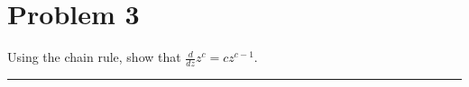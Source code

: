 \documentclass{article}
\newcommand{\der}[2]{\frac{d#1}{d#2}}
\begin{document}
\newpage
\section*{Problem 3}
Using the chain rule, show that $\der{}{z} z^c = cz^{c−1}$.

\vspace{1cm} %

\hrule

% 
\end{document}

